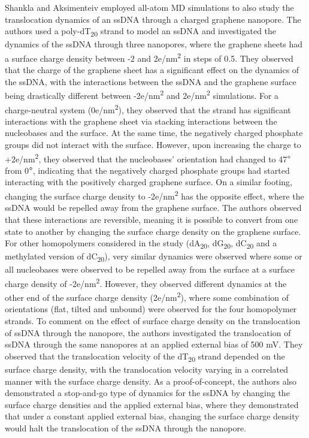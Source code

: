 Shankla and Aksimenteiv employed all-atom MD simulations to also study the translocation dynamics of an ssDNA through a charged graphene nanopore\supercite{shankla_conformational_2014}. The authors used a poly-dT\textsubscript{20} strand to model an ssDNA and investigated the dynamics of the ssDNA through three nanopores, where the graphene sheets had a surface charge density between -2 and 2e/nm\textsuperscript{2} in steps of 0.5. They observed that the charge of the graphene sheet has a significant effect on the dynamics of the ssDNA, with the interactions between the ssDNA and the graphene surface being drastically different between -2e/nm\textsuperscript{2} and 2e/nm\textsuperscript{2} simulations. For a charge-neutral system (0e/nm\textsuperscript{2}), they observed that the strand has significant interactions with the graphene sheet via stacking interactions between the nucleobases and the surface. At the same time, the negatively charged phosphate groups did not interact with the surface. However, upon increasing the charge to +2e/nm\textsuperscript{2}, they observed that the nucleobases' orientation had changed to 47$\degree$ from 0$\degree$, indicating that the negatively charged phosphate groups had started interacting with the positively charged graphene surface. On a similar footing, changing the surface charge density to -2e/nm\textsuperscript{2} has the opposite effect, where the ssDNA would be repelled away from the graphene surface. The authors observed that these interactions are reversible, meaning it is possible to convert from one state to another by changing the surface charge density on the graphene surface. For other homopolymers considered in the study (dA\textsubscript{20}, dG\textsubscript{20}, dC\textsubscript{20} and a methylated version of dC\textsubscript{20}), very similar dynamics were observed where some or all nucleobases were observed to be repelled away from the surface at a surface charge density of -2e/nm\textsuperscript{2}. However, they observed different dynamics at the other end of the surface charge density (2e/nm\textsuperscript{2}), where some combination of orientations (flat, tilted and unbound) were observed for the four homopolymer strands. To comment on the effect of surface charge density on the translocation of ssDNA through the nanopore, the authors investigated the translocation of ssDNA through the same nanopores at an applied external bias of 500 mV. They observed that the translocation velocity of the dT\textsubscript{20} strand depended on the surface charge density, with the translocation velocity varying in a correlated manner with the surface charge density. As a proof-of-concept, the authors also demonstrated a stop-and-go type of dynamics for the ssDNA by changing the surface charge densities and the applied external bias, where they demonstrated that under a constant applied external bias, changing the surface charge density would halt the translocation of the ssDNA through the nanopore.  

